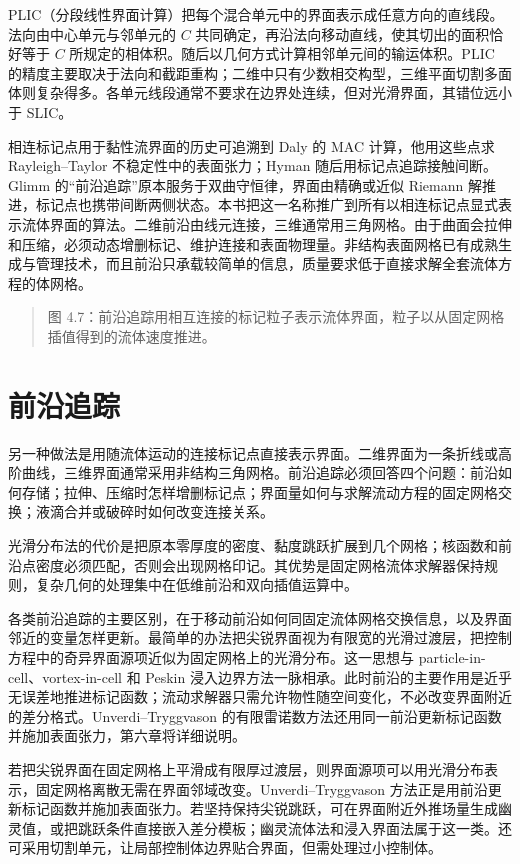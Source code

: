 \documentclass[11pt,a4paper,openany,fontset=none]{ctexbook}
\begin{document}
PLIC（分段线性界面计算）把每个混合单元中的界面表示成任意方向的直线段。法向由中心单元与邻单元的 $C$ 共同确定，再沿法向移动直线，使其切出的面积恰好等于 $C$ 所规定的相体积。随后以几何方式计算相邻单元间的输运体积。PLIC 的精度主要取决于法向和截距重构；二维中只有少数相交构型，三维平面切割多面体则复杂得多。各单元线段通常不要求在边界处连续，但对光滑界面，其错位远小于 SLIC。

相连标记点用于黏性流界面的历史可追溯到 Daly 的 MAC 计算，他用这些点求 Rayleigh--Taylor 不稳定性中的表面张力；Hyman 随后用标记点追踪接触间断。Glimm 的“前沿追踪”原本服务于双曲守恒律，界面由精确或近似 Riemann 解推进，标记点也携带间断两侧状态。本书把这一名称推广到所有以相连标记点显式表示流体界面的算法。二维前沿由线元连接，三维通常用三角网格。由于曲面会拉伸和压缩，必须动态增删标记、维护连接和表面物理量。非结构表面网格已有成熟生成与管理技术，而且前沿只承载较简单的信息，质量要求低于直接求解全套流体方程的体网格。

\begin{quote}\small 图 4.7：前沿追踪用相互连接的标记粒子表示流体界面，粒子以从固定网格插值得到的流体速度推进。\end{quote}
\section{前沿追踪}

另一种做法是用随流体运动的连接标记点直接表示界面。二维界面为一条折线或高阶曲线，三维界面通常采用非结构三角网格。前沿追踪必须回答四个问题：前沿如何存储；拉伸、压缩时怎样增删标记点；界面量如何与求解流动方程的固定网格交换；液滴合并或破碎时如何改变连接关系。

光滑分布法的代价是把原本零厚度的密度、黏度跳跃扩展到几个网格；核函数和前沿点密度必须匹配，否则会出现网格印记。其优势是固定网格流体求解器保持规则，复杂几何的处理集中在低维前沿和双向插值运算中。

各类前沿追踪的主要区别，在于移动前沿如何同固定流体网格交换信息，以及界面邻近的变量怎样更新。最简单的办法把尖锐界面视为有限宽的光滑过渡层，把控制方程中的奇异界面源项近似为固定网格上的光滑分布。这一思想与 particle-in-cell、vortex-in-cell 和 Peskin 浸入边界方法一脉相承。此时前沿的主要作用是近乎无误差地推进标记函数；流动求解器只需允许物性随空间变化，不必改变界面附近的差分格式。Unverdi--Tryggvason 的有限雷诺数方法还用同一前沿更新标记函数并施加表面张力，第六章将详细说明。

若把尖锐界面在固定网格上平滑成有限厚过渡层，则界面源项可以用光滑分布表示，固定网格离散无需在界面邻域改变。Unverdi--Tryggvason 方法正是用前沿更新标记函数并施加表面张力。若坚持保持尖锐跳跃，可在界面附近外推场量生成幽灵值，或把跳跃条件直接嵌入差分模板；幽灵流体法和浸入界面法属于这一类。还可采用切割单元，让局部控制体边界贴合界面，但需处理过小控制体。
\end{document}
